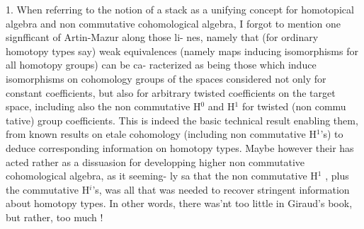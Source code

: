 1.  When referring  to the notion of a stack as a unifying concept
for homotopical algebra and non commutative cohomological algebra,  I
forgot to mention one signfficant  of Artin-Mazur along those li-%
nes,  namely that (for ordinary homotopy types say) weak equivalences
(namely maps inducing isomorphisms for all homotopy groups)  can be ca-%
racterized as being those which induce isomorphisms on cohomology groups
 of the spaces considered not only for constant coefficients,  but
also for  arbitrary twisted coefficients on the target space,
including also the non commutative H$^{0}$ and H$^{1}$ for twisted  (non commu%
tative) group coefficients.  This is indeed the basic technical result
enabling them,  from known results on etale cohomology (including non
commutative H$^{1}$'s) to deduce corresponding information on homotopy types.
Maybe however  their  has acted rather as a dissuasion for
developping higher non commutative cohomological algebra,  as it seeming-%
\margin{-}ly sa that the non commutative H$^{1}$ ,  plus the commutative H$^{i}$\hand{\unsure{,}}'s, was
all that was needed to recover stringent information about homotopy
types.  In other words,  there was'nt too little in Giraud's book,
but rather,  too much !
